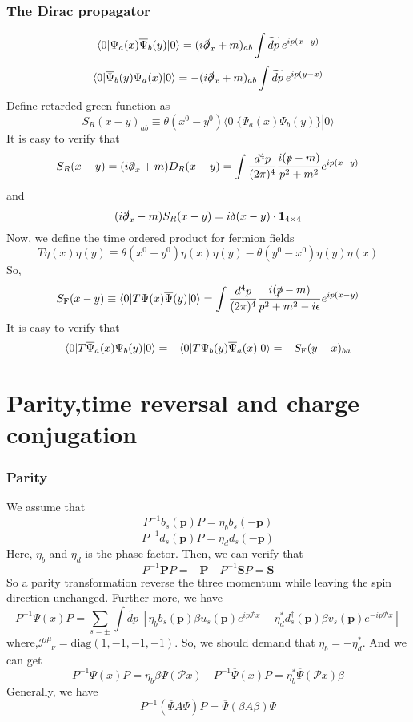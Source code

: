 \subsubsection{The Dirac propagator}
\[\langle 0 | \Psi_a(x)\overline{\Psi}_b(y)|0\rangle = (i\slashed{\partial}_x+m)_{ab} \int \widetilde{dp} \: e^{ip(x-y)}\]
\[\langle 0 | \overline{\Psi}_b(y) \Psi_a(x)|0\rangle = -(i\slashed{\partial}_x+m)_{ab} \int \widetilde{dp} \: e^{ip(y-x)}\]
Define retarded green function as
\[S_{R}(x-y)_{ab} \equiv \theta(x^0-y^0) \langle 0 | \{\Psi_a(x)\overline{\Psi}_b(y)\}|0\rangle\]
It is easy to verify that
\[S_{R}(x-y) = (i\slashed{\partial}_x+m) D_R(x-y) = \int \frac{d^4p}{(2\pi)^4} \frac{i(\slashed{p}-m)}{p^2+m^2} e^{ip(x-y)}\]
and
\[(i\slashed{\partial}_x-m) S_{R}(x-y) = i\delta(x-y) \cdot \bm{1}_{4\times 4}\]
Now, we  define  the time ordered product for fermion fields
\[T \eta(x) \eta(y) \equiv \theta(x^0-y^0)\eta(x)\eta(y) - \theta(y^0-x^0)\eta(y)\eta(x)\]
So,
\[S_{\rm F}(x-y) \equiv \langle 0 | T \Psi(x)\overline{\Psi}(y)|0\rangle =  \int \frac{d^4p}{(2\pi)^4} \frac{i(\slashed{p}-m)}{p^2+m^2 - i\epsilon} e^{ip(x-y)}\]
It is easy to verify that
\[\langle 0 | T \overline{\Psi}_a(x) \Psi_b(y)|0\rangle = - \langle 0 | T \Psi_b(y) \overline{\Psi}_a(x)|0\rangle = -S_{\rm F}(y-x)_{ba}\]

\section{Parity,time reversal and charge conjugation}
\subsubsection{Parity}
\noindent
We assume that
\[P^{-1} b_s(\bm{p})P = \eta_b b_s(\bm{-p})\]
\[P^{-1} d_s(\bm{p})P = \eta_d d_s(\bm{-p})\]
Here, $\eta_b$ and $\eta_d$ is the phase factor. Then, we can verify that
\[P^{-1} \bm{P} P = -\bm{P} \quad P^{-1} \bm{S} P =  \bm{S}\]
So a parity transformation reverse the three momentum while leaving the spin direction unchanged. Further more, we have
\[P^{-1}\Psi(x)P = \sum_{s=\pm} \int \widetilde{dp} \: \left [ \eta_b b_s(\bm{p})\beta u_s(\bm{p})e^{ip\mathcal{P}x} - \eta_d^* d^{\dagger}_s(\bm{p}) \beta v_s(\bm{p})e^{-ip\mathcal{P}x} \right ]\]
where,$\mathcal{P}^{\mu}_{\phantom{\mu}\nu} = \mathrm{diag}(1,-1,-1,-1)$.
So, we should demand that $\eta_b = -\eta^*_d$. And we can get
\[P^{-1}\Psi(x)P = \eta_b \beta \Psi(\mathcal{P}x) \quad P^{-1}\overline{\Psi}(x)P = \eta^*_b  \overline{\Psi}(\mathcal{P}x)\beta \]
Generally, we have
\[P^{-1} (\overline{\Psi} A \Psi) P = \overline{\Psi}(\beta A \beta)\Psi\]

